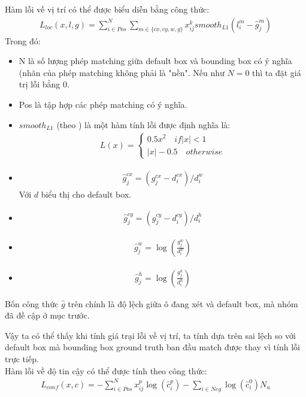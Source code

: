 \documentclass[a4paper]{article}
\theoremstyle{definition}
\begin{document}
	Hàm lỗi về vị trí có thể được biểu diễn bằng công thức:
	\begin{align}
	L_{loc}(x,l,g) = \sum^N_{i \in Pos} \sum_{m \in \{ cx, cy, w, g \}} x^k_{ij} smooth_{L1} (l^m_i - \hat{g}^m_j)
	\end{align}
	Trong đó:
	\begin{itemize}
		\item N là số lượng phép matching giữa default box và bounding box có ý nghĩa (nhãn của phép matching không phải là "nền". Nếu như $N = 0$ thì ta đặt giá trị lỗi bằng 0.
		\item Pos là tập hợp các phép matching có ý nghĩa.
		\item $smooth_{L1}$ (theo \cite{girshick2015fast}) là một hàm tính lỗi được định nghĩa là:
		\begin{align}
		L(x) = \begin{cases} 0.5x^2 \quad if |x| < 1 \\ |x| - 0.5 \quad otherwise \end{cases}
		\end{align}
		\item \begin{align}\hat{g}_j^{cx} = (g_j^{cx} - d_i^{cx}) / d^w_i\end{align}Với $d$ biểu thị cho default box.
		\item \begin{align}\hat{g}_j^{cy} = (g_j^{cy} - d_i^{cy}) / d^h_i\end{align}
		\item \begin{align}\hat{g}^w_j = \log \left( \frac{g_j^w}{d_i^w} \right)\end{align}
		\item \begin{align}\hat{g}^h_j = \log \left( \frac{g_j^h}{d_i^h} \right)\end{align}
	\end{itemize}
	
	Bốn công thức $\hat{g}$ trên chính là độ lệch giữa ô đang xét và default box, mà nhóm đã đề cập ở mục trước.
	
	Vậy ta có thể thấy khi tính giá trại lỗi về vị trí, ta tính dựa trên sai lệch so với default box mà bounding box ground truth ban đầu match được thay vì tính lỗi trực tiếp.\\
	
	Hàm lỗi về độ tin cậy có thể được tính theo công thức:
	\begin{align}
	L_{conf}(x, c) = - \sum^N_{i \in Pos} x^p_{ij} \log (\hat{c}^p_i) - \sum_{i \in Neg} \log (\hat{c}^0_i)
	N_u	\end{align}
	
\end{document}

